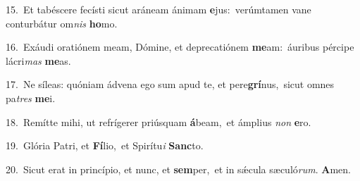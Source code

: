 {\numbfont\textcolor{\numbcolor}{15.}}~Et tabéscere fecísti sicut aráneam ánimam \textbf{e}\-jus:~\star verúmtamen vane conturbátur om\textit{nis} \textbf{ho}\-mo.\par
{\numbfont\textcolor{\numbcolor}{16.}}~Exáudi oratiónem meam, Dómine, et deprecatiónem \textbf{me}\-am:~\star áuribus pércipe lácri\textit{mas} \textbf{me}\-as.\par
{\numbfont\textcolor{\numbcolor}{17.}}~Ne síleas: quóniam ádvena ego sum apud te, et pere\-\textbf{grí}\-nus,~\star sicut omnes pa\textit{tres} \textbf{me}\-i.\par
{\numbfont\textcolor{\numbcolor}{18.}}~Remítte mihi, ut refrígerer priúsquam \textbf{á}\-beam,~\star et ámplius \textit{non} \textbf{e}\-ro.\par
{\numbfont\textcolor{\numbcolor}{19.}}~Glória Patri, et \textbf{Fí}\-lio,~\star et Spirítu\textit{i} \textbf{Sanc}\-to.\par
{\numbfont\textcolor{\numbcolor}{20.}}~Sicut erat in princípio, et nunc, et \textbf{sem}\-per,~\star et in sǽcula sæculó\-\textit{rum}\-. \textbf{A}\-men.\par
